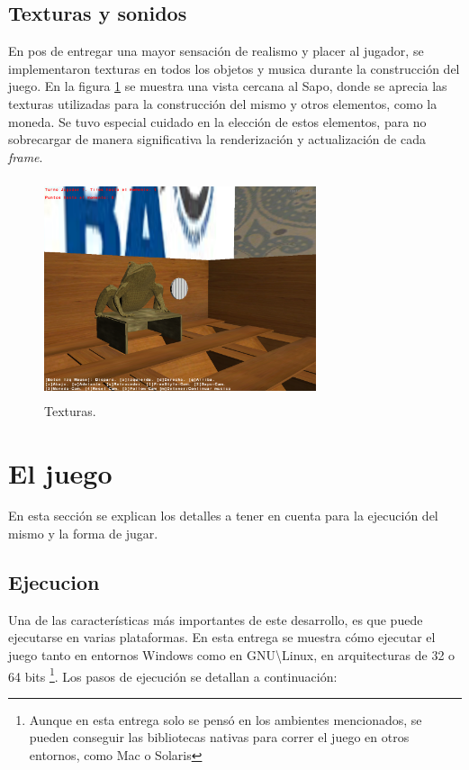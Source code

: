 \documentclass{acm_proc_article-sp}
\begin{document}
\subsection{Texturas y sonidos}

En pos de entregar una mayor sensaci\'on de realismo y placer al jugador, se implementaron texturas en todos los objetos y musica durante la construcci\'on del juego. En la figura \ref{fig:texturas} se muestra una vista cercana al Sapo, donde se aprecia las texturas utilizadas para la construcci\'on del mismo y otros elementos, como la moneda. Se tuvo especial cuidado en la elecci\'on de estos elementos, para no sobrecargar de manera significativa la renderizaci\'on y actualizaci\'on de cada \textit{frame}. 

\begin{figure}[!ht]
	\centering
		\includegraphics[width=8cm,height=6.45cm]{img/littleSapoShoot.png}
	\caption{Texturas.}
	\label{fig:texturas}
\end{figure}

\section{El juego}
\label{sec:juego}

En esta secci\'on se explican los detalles a tener en cuenta para la ejecuci\'on del mismo y la forma de jugar.
\subsection{Ejecucion}
Una de las caracter\'isticas m\'as importantes de este desarrollo, es que puede ejecutarse en varias plataformas. En esta entrega se muestra c\'omo ejecutar el juego tanto en entornos Windows como en GNU\textbackslash Linux, en arquitecturas de 32 o 64 bits \footnote{Aunque en esta entrega solo se pens\'o en los ambientes mencionados, se pueden conseguir las bibliotecas nativas para correr el juego en otros entornos, como Mac o Solaris}.
Los pasos de ejecuci\'on se detallan a continuaci\'on:
\end{document}
